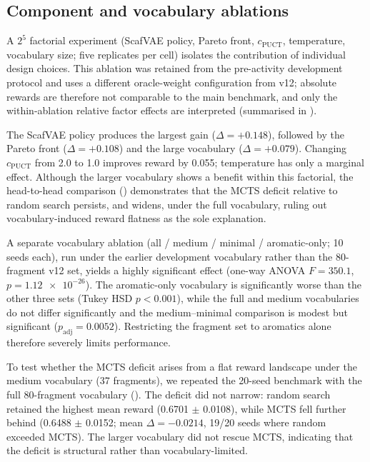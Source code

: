 \documentclass[10pt,a4paper]{article}
\begin{document}
\subsection{Component and vocabulary ablations}
\label{sec:ablation}

A $2^{5}$ factorial experiment (ScafVAE policy, Pareto front, $c_{\text{PUCT}}$, temperature, vocabulary size; five replicates per cell) isolates the contribution of individual design choices. This ablation was retained from the pre-activity development protocol and uses a different oracle-weight configuration from v12; absolute rewards are therefore not comparable to the main benchmark, and only the within-ablation relative factor effects are interpreted (summarised in ).

The ScafVAE policy produces the largest gain ($\Delta = +\num{0.148}$), followed by the Pareto front ($\Delta = +\num{0.108}$) and the large vocabulary ($\Delta = +\num{0.079}$). Changing $c_{\text{PUCT}}$ from \num{2.0} to \num{1.0} improves reward by \num{0.055}; temperature has only a marginal effect. Although the larger vocabulary shows a benefit within this factorial, the head-to-head comparison () demonstrates that the MCTS deficit relative to random search persists, and widens, under the full vocabulary, ruling out vocabulary-induced reward flatness as the sole explanation. 

A separate vocabulary ablation (all / medium / minimal / aromatic-only; \num{10} seeds each), run under the earlier development vocabulary rather than the \num{80}-fragment v12 set, yields a highly significant effect (one-way ANOVA $F=\num{350.1}$, $p=\num{1.12e-26}$). The aromatic-only vocabulary is significantly worse than the other three sets (Tukey HSD $p<\num{0.001}$), while the full and medium vocabularies do not differ significantly and the medium--minimal comparison is modest but significant ($p_{\mathrm{adj}}=\num{0.0052}$). Restricting the fragment set to aromatics alone therefore severely limits performance.

To test whether the MCTS deficit arises from a flat reward landscape under the medium vocabulary (\num{37} fragments), we repeated the \num{20}-seed benchmark with the full \num{80}-fragment vocabulary (). The deficit did not narrow: random search retained the highest mean reward (\num{0.6701} $\pm$ \num{0.0108}), while MCTS fell further behind (\num{0.6488} $\pm$ \num{0.0152}; mean $\Delta = \num{-0.0214}$, \num{19}/\num{20} seeds where random exceeded MCTS). The larger vocabulary did not rescue MCTS, indicating that the deficit is structural rather than vocabulary-limited.
\end{document}
